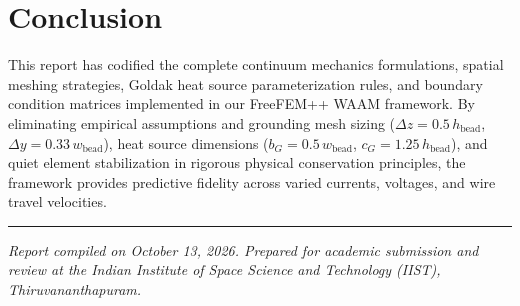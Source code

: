 \documentclass[10pt,a4paper]{article}
\begin{document}
\section{Conclusion}
This report has codified the complete continuum mechanics formulations, spatial meshing strategies, Goldak heat source parameterization rules, and boundary condition matrices implemented in our FreeFEM++ WAAM framework. By eliminating empirical assumptions and grounding mesh sizing ($\Delta z = 0.5\,h_{\mathrm{bead}}$, $\Delta y = 0.33\,w_{\mathrm{bead}}$), heat source dimensions ($b_G = 0.5\,w_{\mathrm{bead}}$, $c_G = 1.25\,h_{\mathrm{bead}}$), and quiet element stabilization in rigorous physical conservation principles, the framework provides predictive fidelity across varied currents, voltages, and wire travel velocities.

\vspace{1.0em}
\noindent\rule{0.4\textwidth}{0.4pt}\par
\vspace{0.2em}
\noindent\small\textit{Report compiled on October 13, 2026. Prepared for academic submission and review at the Indian Institute of Space Science and Technology (IIST), Thiruvananthapuram.}
\end{document}
